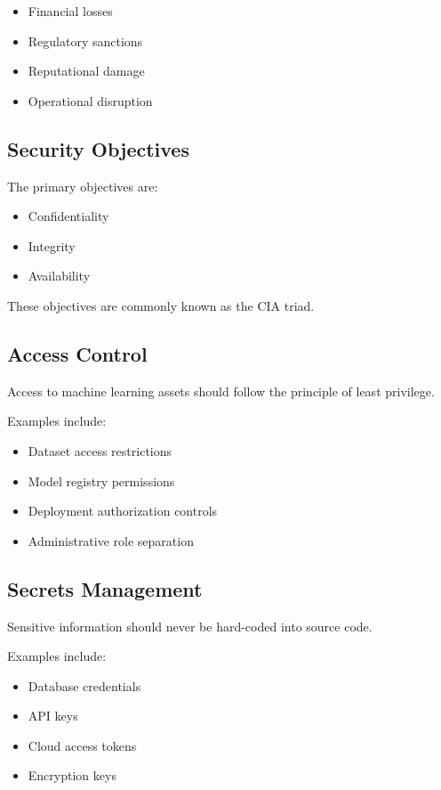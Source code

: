 \begin{itemize}
    \item Financial losses
    \item Regulatory sanctions
    \item Reputational damage
    \item Operational disruption
\end{itemize}

\subsection{Security Objectives}

The primary objectives are:

\begin{itemize}
    \item Confidentiality
    \item Integrity
    \item Availability
\end{itemize}

These objectives are commonly known as the CIA triad.

\subsection{Access Control}

Access to machine learning assets should follow the principle of least privilege.

Examples include:

\begin{itemize}
    \item Dataset access restrictions
    \item Model registry permissions
    \item Deployment authorization controls
    \item Administrative role separation
\end{itemize}

\subsection{Secrets Management}

Sensitive information should never be hard-coded into source code.

Examples include:

\begin{itemize}
    \item Database credentials
    \item API keys
    \item Cloud access tokens
    \item Encryption keys
\end{itemize}


